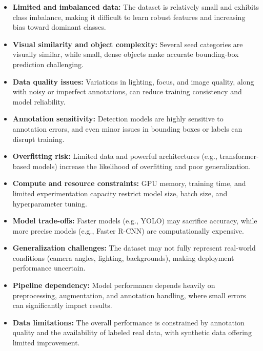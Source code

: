 \begin{itemize}
\item \textbf{Limited and imbalanced data:} The dataset is relatively small and exhibits class imbalance, making it difficult to learn robust features and increasing bias toward dominant classes.

\item \textbf{Visual similarity and object complexity:} Several seed categories are visually similar, while small, dense objects make accurate bounding-box prediction challenging.

\item \textbf{Data quality issues:} Variations in lighting, focus, and image quality, along with noisy or imperfect annotations, can reduce training consistency and model reliability.

\item \textbf{Annotation sensitivity:} Detection models are highly sensitive to annotation errors, and even minor issues in bounding boxes or labels can disrupt training.

\item \textbf{Overfitting risk:} Limited data and powerful architectures (e.g., transformer-based models) increase the likelihood of overfitting and poor generalization.

\item \textbf{Compute and resource constraints:} GPU memory, training time, and limited experimentation capacity restrict model size, batch size, and hyperparameter tuning.

\item \textbf{Model trade-offs:} Faster models (e.g., YOLO) may sacrifice accuracy, while more precise models (e.g., Faster R-CNN) are computationally expensive.

\item \textbf{Generalization challenges:} The dataset may not fully represent real-world conditions (camera angles, lighting, backgrounds), making deployment performance uncertain.

\item \textbf{Pipeline dependency:} Model performance depends heavily on preprocessing, augmentation, and annotation handling, where small errors can significantly impact results.

\item \textbf{Data limitations:} The overall performance is constrained by annotation quality and the availability of labeled real data, with synthetic data offering limited improvement.
\end{itemize}